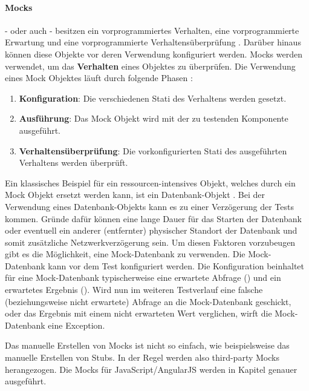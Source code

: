 \paragraph{Mocks}
 - oder auch  - besitzen ein vorprogrammiertes Verhalten, eine vorprogrammierte Erwartung und eine vorprogrammierte Verhaltensüberprüfung \autocite[453]{Johansen:2011}. Darüber hinaus können diese Objekte vor deren Verwendung konfiguriert werden. Mocks werden verwendet, um das \textbf{Verhalten} eines Objektes zu überprüfen. Die Verwendung eines Mock Objektes läuft durch folgende Phasen \autocite[453]{Johansen:2011}:
\begin{enumerate}
  \item \textbf{Konfiguration}: \newline
  Die verschiedenen Stati des Verhaltens werden gesetzt.
  \item \textbf{Ausführung}: \newline
  Das Mock Objekt wird mit der zu testenden Komponente ausgeführt.
  \item \textbf{Verhaltensüberprüfung}: \newline
  Die vorkonfigurierten Stati des ausgeführten Verhaltens werden überprüft.
\end{enumerate}

Ein klassisches Beispiel für ein ressourcen-intensives Objekt, welches durch ein Mock Objekt ersetzt werden kann, ist ein Datenbank-Objekt \autocite[144]{Beck:2003}. Bei der Verwendung eines Datenbank-Objekts kann es zu einer Verzögerung der Tests kommen. Gründe dafür können eine lange Dauer für das Starten der Datenbank oder eventuell ein anderer (entfernter) physischer Standort der Datenbank und somit zusätzliche Netzwerkverzögerung sein. Um diesen Faktoren vorzubeugen gibt es die Möglichkeit, eine Mock-Datenbank zu verwenden. Die Mock-Datenbank kann vor dem Test konfiguriert werden. Die Konfiguration beinhaltet für eine Mock-Datenbank typischerweise eine erwartete Abfrage () und ein erwartetes Ergebnis (). Wird nun im weiteren Testverlauf eine falsche (beziehungsweise nicht erwartete) Abfrage an die Mock-Datenbank geschickt, oder das Ergebnis mit einem nicht erwarteten Wert verglichen, wirft die Mock-Datenbank eine Exception.

Das manuelle Erstellen von Mocks ist nicht so einfach, wie beispielsweise das manuelle Erstellen von Stubs. In der Regel werden also third-party Mocks herangezogen. Die Mocks für JavaScript/AngularJS werden in Kapitel  genauer ausgeführt.

